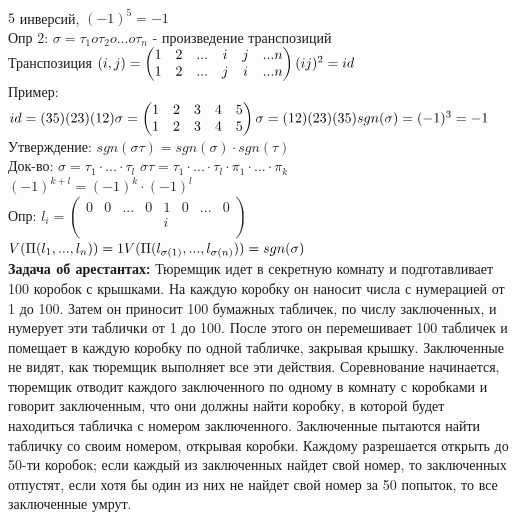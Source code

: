 \documentclass[12pt, oneside]{book}
\theoremstyle{definition}
\begin{document}
\begin{enumerate}
\begin{figure}[h!]
\end{figure}\\
$5$ инверсий, $(-1)^5 = -1$\\
Опр 2: $\sigma = {\tau}_1 o {\tau}_2 o ...o {\tau}_n$ - произведение транспозиций\\
Транспозиция $(i,j) = \begin{pmatrix}
1 & 2 & ... & i & j & ...  n\\
1 & 2 & ... & j & i & ...  n\\
\end{pmatrix}\\
(ij)^2 = id$\\
Пример: $id = (35)(23)(12)\sigma = \begin{pmatrix}
1 & 2 & 3 & 4 & 5\\
1 & 2 & 3 & 4 & 5\\
\end{pmatrix}\\
\sigma = (12)(23)(35)\\
sgn(\sigma) = (-1)^3 = -1$\\
Утверждение: $sgn(\sigma \tau) = sgn(\sigma) \cdot sgn(\tau)$\\
Док-во: $\sigma = {\tau}_1 \cdot ... \cdot {\tau}_l$
$\sigma \tau = {\tau}_1 \cdot ... \cdot {\tau}_l \cdot {\pi}_1 \cdot ... \cdot {\pi}_k$\\
$(-1)^{k+l} = (-1)^k \cdot (-1)^l$\\
Опр: $l_i = \begin{pmatrix}
0 & 0 & ... & 0 & 1 & 0 & ... & 0\\
 & & & & i & & & \\
\end{pmatrix}$
$V(\Pi (l_1, ..., l_n)) = 1\\
V(\Pi (l_{\sigma (1)},..., l_{\sigma (n)})) = sgn (\sigma)$\\
\textbf{Задача об арестантах:}  Тюремщик идет в секретную комнату и подготавливает 100 коробок с крышками. На каждую коробку он наносит числа с нумерацией от 1 до 100. Затем он приносит 100 бумажных табличек, по числу заключенных, и нумерует эти таблички от 1 до 100. После этого он перемешивает 100 табличек и помещает в каждую коробку по одной табличке, закрывая крышку. Заключенные не видят, как тюремщик выполняет все эти действия. Соревнование начинается, тюремщик отводит каждого заключенного по одному в комнату с коробками и говорит заключенным, что они должны найти коробку, в которой будет находиться табличка с номером заключенного. Заключенные пытаются найти табличку со своим номером, открывая коробки. Каждому разрешается открыть до 50-ти коробок; если каждый из заключенных найдет свой номер, то заключенных отпустят, если хотя бы один из них не найдет свой номер за 50 попыток, то все заключенные умрут.\\

\end{enumerate}
\end{document}
